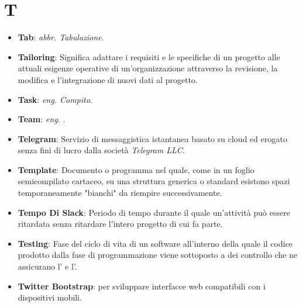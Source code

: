 \section{T}
\begin{itemize}
	\item
	\textbf{Tab}: \textit{abbr. Tabulazione}.
	\item
	\textbf{Tailoring}: Significa adattare i requisiti e le specifiche di un progetto alle attuali esigenze operative di un'organizzazione attraverso la revisione, la modifica e l'integrazione di nuovi dati al progetto.
	\item
	\textbf{Task}: \textit{eng. Compito}.
	\item
	\textbf{Team}: \textit{eng. }.
	\item
	\textbf{Telegram}: Servizio di messaggistica istantanea basato su cloud ed erogato senza fini di lucro dalla società \textit{Telegram LLC}.
	\item
	\textbf{Template}: Documento o programma nel quale, come in un foglio semicompilato cartaceo, su una struttura generica o standard esistono spazi temporaneamente "bianchi" da riempire successivamente.
	\item
	\textbf{Tempo Di Slack}: Periodo di tempo durante il quale un'attività può essere ritardata senza ritardare l'intero progetto di cui fa parte.
	\item
	\textbf{Testing}: Fase del ciclo di vita di un software all'interno della quale il codice prodotto dalla fase di programmazione viene sottoposto a dei controllo che ne assicurano l' e l'.
	\item
	\textbf{Twitter Bootstrap}:  per sviluppare interfacce web compatibili con i dispositivi mobili.
\end{itemize}
\newpage